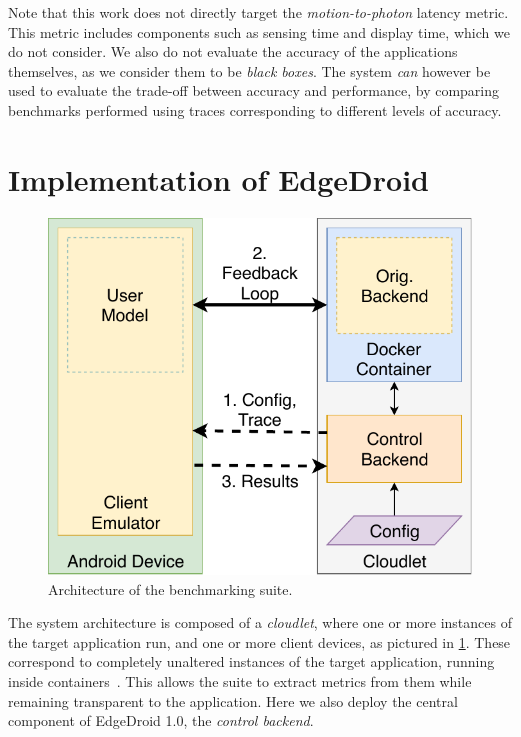 Note that this work does not directly target the \emph{motion-to-photon} latency metric.
This metric includes components such as sensing time and display time, which we do not consider.
We also do not evaluate the accuracy of the applications themselves, as we consider them to be \emph{black boxes}.
The system \emph{can} however be used to evaluate the trade-off between accuracy and performance, by comparing benchmarks performed using traces corresponding to different levels of accuracy.


\section{Implementation of EdgeDroid}\label{sec:implementation}

\begin{figure}[tb]
    \centering
    \includegraphics[width=.7\columnwidth]{publications/2019EdgeDroid/img/TraceReplay_GenArch}
    \caption{Architecture of the benchmarking suite.}\label{fig:TraceReplayArch}
\end{figure}


The system architecture is composed of a \emph{cloudlet}, where one or more instances of the target application run, and one or more client devices, as pictured in \cref{fig:TraceReplayArch}.
These correspond to completely unaltered instances of the target application, running inside containers~\cite{docker}.
This allows the suite to extract metrics from them while remaining transparent to the application.
Here we also deploy the central component of EdgeDroid 1.0, the \emph{control backend}.

